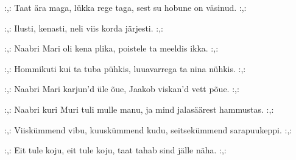 :,: Taat \"ara maga, l\"ukka rege taga,
    sest su hobune on v\"asinud. :,: 

:,: Ilusti, kenasti,
neli viis korda j\"arjesti. :,: 

:,: Naabri Mari oli kena plika,
    poistele ta meeldis ikka. :,: 

:,: Hommikuti kui ta tuba p\"uhkis,
    luuavarrega ta nina n\"uhkis. :,: 

:,: Naabri Mari karjun'd \"ule \~oue,
    Jaakob viskan'd vett p\~oue. :,: 

:,: Naabri kuri Muri tuli mulle manu,
    ja mind jalas\"a\"arest hammustas. :,: 

:,: Viisk\"ummend vibu, kuusk\"ummend kudu,
    seitsek\"ummend sarapuukeppi. :,: 

:,: Eit tule koju, eit tule koju,
    taat tahab sind j\"alle n\"aha. :,: 
